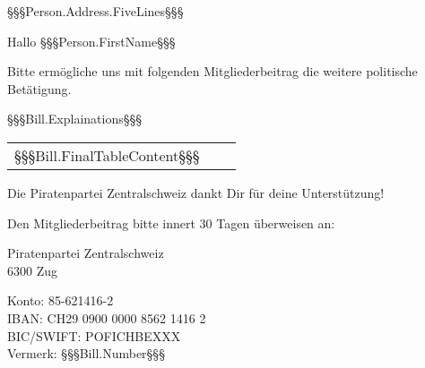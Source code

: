 ﻿\documentclass[ppsletter,fontsize=11pt,foldmarks=false ]{scrlttr2}
\begin{document}


\begin{letter}{%
    §§§Person.Address.FiveLines§§§
}

\enlargethispage{10cm}

\opening{Hallo §§§Person.FirstName§§§}

Bitte ermögliche uns mit folgenden Mitgliederbeitrag die weitere politische Betätigung.

\vspace{0.2cm}

§§§Bill.Explainations§§§

\vspace{0.2cm}

\begin{tabular}{ l r l }
§§§Bill.FinalTableContent§§§
\end{tabular}

\vspace{0.2cm}

Die Piratenpartei Zentralschweiz dankt Dir für deine Unterstützung!

\vspace{1cm}
Den Mitgliederbeitrag bitte innert 30 Tagen überweisen an:

Piratenpartei Zentralschweiz \\
6300 Zug

Konto: 85-621416-2 \\
IBAN: CH29 0900 0000 8562 1416 2 \\
BIC/SWIFT: POFICHBEXXX \\
Vermerk: §§§Bill.Number§§§

\end{letter}%
\end{document}
